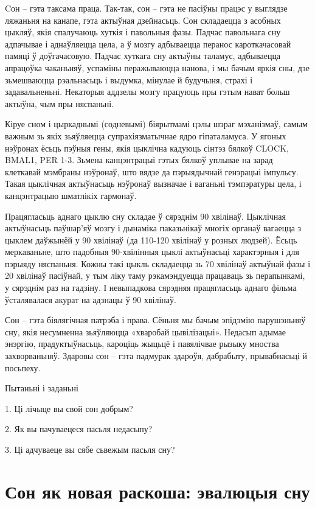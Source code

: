 Cон – гэта таксама праца. Так-так, сон – гэта не пасіўны працэс у выглядзе ляжаньня на канапе, гэта актыўная дзейнасьць. Сон складаецца з асобных цыкляў, якія спалучаюць хуткія і павольныя фазы. Падчас павольнага сну адпачывае і аднаўляецца цела, а ў мозгу адбываецца перанос кароткачасовай памяці ў доўгачасовую. Падчас хуткага сну актыўны таламус, адбываецца апрацоўка чаканьняў, успаміны перажываюцца нанова, і мы бачым яркія сны, дзе зьмешваюцца рэальнасьць і выдумка, мінулае й будучыня, страхі і задавальненьні. Некаторыя аддзелы мозгу працуюць пры гэтым нават больш актыўна, чым пры няспаньні.

Кіруе сном і цыркаднымі (содневымі) біярытмамі цэлы шэраг мэханізмаў, самым важным зь якіх зьяўляецца супрахіязматычнае ядро гіпаталамуса. У ягоных нэўронах ёсьць пэўныя гены, якія цыклічна кадуюць сінтэз бялкоў CLOCK, BMAL1, PER 1-3. Зьмена канцэнтрацыі гэтых бялкоў уплывае на зарад клеткавай мэмбраны нэўронаў, што вядзе да пэрыядычнай генэрацыі імпульсу. Такая цыклічная актыўнасьць нэўронаў вызначае і ваганьні тэмпэратуры цела, і канцэнтрацыю шматлікіх гармонаў.

Працягласьць аднаго цыклю сну складае ў сярэднім 90 хвілінаў. Цыклічная актыўнасьць паўшар'яў мозгу і дынаміка паказьнікаў многіх органаў вагаецца з цыклем даўжынёй у 90 хвілінаў (да 110-120 хвілінаў у розных людзей). Ёсьць меркаваньне, што падобныя 90-хвілінныя цыклі актыўнасьці характэрныя і для пэрыяду няспаньня. Кожны такі цыкль складаецца зь 70 хвілінаў актыўнай фазы і 20 хвілінаў пасіўнай, у тым ліку таму рэкамэндуецца працаваць зь перапынкамі, у сярэднім раз на гадзіну. І невыпадкова сярэдняя працягласьць аднаго фільма ўсталявалася акурат на адзнацы ў 90 хвілінаў.

Сон – гэта біялягічная патрэба і права. Сёньня мы бачым эпідэмію парушэньняў сну, якія несумненна зьяўляюцца «хваробай цывілізацыі». Недасып адымае энэргію, прадуктыўнасьць, кароціць жыцьцё і павялічвае рызыку мноства захворваньняў. Здаровы сон – гэта падмурак здароўя, дабрабыту, прывабнасьці й посьпеху.

Пытаньні і заданьні

1. Ці лічыце вы свой сон добрым?

2. Як вы пачуваецеся пасьля недасыпу?

3. Ці адчуваеце вы сябе сьвежым пасьля сну?


\section{Сон як новая раскоша: эвалюцыя сну}

